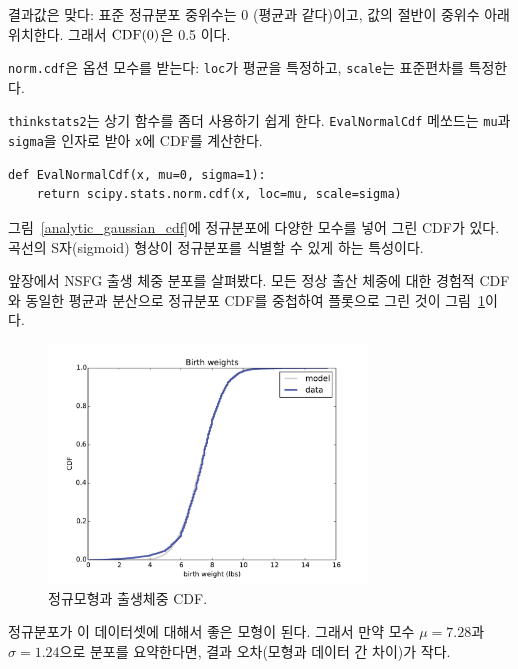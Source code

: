 결과값은 맞다: 표준 정규분포 중위수는 0 (평균과 같다)이고, 값의 절반이 중위수 아래 위치한다.
그래서 $\mathrm{CDF}(0)$은 0.5 이다.

{\tt norm.cdf}은 옵션 모수를 받는다: {\tt loc}가
평균을 특정하고, {\tt scale}는 표준편차를 특정한다.


{\tt thinkstats2}는 상기 함수를 좀더 사용하기 쉽게 한다.
{\tt EvalNormalCdf} 메쏘드는 {\tt mu}과 {\tt sigma}을 인자로 받아 
{\tt x}에 CDF를 계산한다.


\begin{verbatim}
def EvalNormalCdf(x, mu=0, sigma=1):
    return scipy.stats.norm.cdf(x, loc=mu, scale=sigma)
\end{verbatim}

그림~\ref{analytic_gaussian_cdf}에 정규분포에 다양한 모수를 넣어 그린 CDF가 있다.
곡선의 S자(sigmoid) 형상이 정규분포를 식별할 수 있게 하는 특성이다.

앞장에서 NSFG 출생 체중 분포를 살펴봤다.
모든 정상 출산 체중에 대한 경험적 CDF와 동일한 평균과 분산으로 정규분포 CDF를 중첩하여 
플롯으로 그린 것이 그림~\ref{analytic_birthwgt_model}이다.


\begin{figure}
\centerline{\includegraphics[height=2.5in]{figs/analytic_birthwgt_model.pdf}}
\caption{정규모형과 출생체중 CDF.}
\label{analytic_birthwgt_model}
\end{figure}

정규분포가 이 데이터셋에 대해서 좋은 모형이 된다.
그래서 만약 모수 $\mu = 7.28$과 $\sigma = 1.24$으로 
분포를 요약한다면, 결과 오차(모형과 데이터 간 차이)가 작다.


